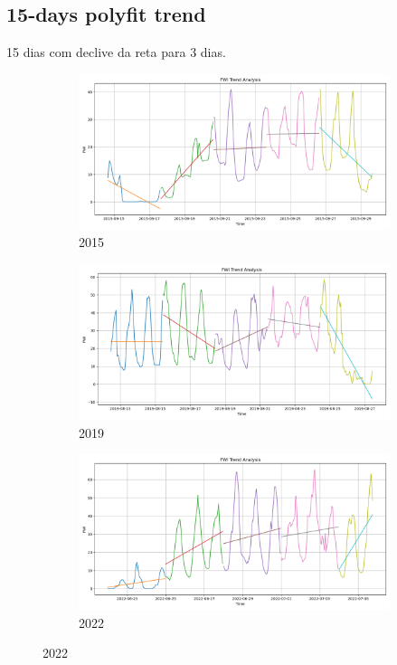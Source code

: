 \subsection{15-days polyfit trend}
15 dias com declive da reta para 3 dias.
\begin{figure}[h]
	\centering
	\caption{15-days FWI polyfit trend}
	\begin{subfigure}{0.3\textwidth}
		\centering
		\includegraphics[width=\textwidth]{graphs/polyfit_trend_analysis/2015_15days_BLOCK3days_FWI_trend_analysis.png}
		\caption{2015}
		\label{fig:2015_polyfit_fwi}
	\end{subfigure}
	\hfill
	\begin{subfigure}{0.3\textwidth}
		\centering
		\includegraphics[width=\textwidth]{graphs/polyfit_trend_analysis/2019_15days_BLOCK3days_FWI_trend_analysis.png}
		\caption{2019}
		\label{fig:2019_polyfit_fwi}
	\end{subfigure}
	\hfill
	\begin{subfigure}{0.3\textwidth}
		\centering
		\includegraphics[width=\textwidth]{graphs/polyfit_trend_analysis/2022_15days_BLOCK3days_FWI_trend_analysis.png}
		\caption{2022}
		\label{fig:2022_polyfit_fwi}
	\end{subfigure}
	
	\label{fig:fwi_polyfit_15}
\end{figure}

